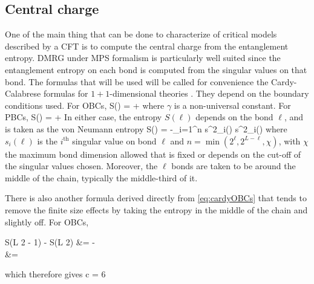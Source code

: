 	\subsection{Central charge}

		One of the main thing that can be done to characterize of critical models described by a CFT is to compute the central charge from the entanglement entropy. DMRG under MPS formalism is particularly well suited since the entanglement entropy on each bond is computed from the singular values on that bond. The formulas that will be used will be called for convenience the Cardy-Calabrese formulas for $1+1$-dimensional theories \cite{calabrese2004}. They depend on the boundary conditions used. For OBCs,
		\be S(\ell) =  \ln{} + \gamma \label{eq:cardyOBCs} \ee
		where $\gamma$ is a non-universal constant. For PBCs, 
		\be S(\ell) =  \ln{} + \gamma \label{eq:cardyPBCs} \ee
		In either case, the entropy $S(\ell)$ depends on the bond $\ell$, and is taken as the von Neumann entropy
		\be S(\ell) = -\sum_{i=1}^{n} s^2_i(\ell) \ln s^2_i(\ell) \ee
		where $s_i(\ell)$ is the $i^\text{th}$ singular value on bond $\ell$ and $n= \min(2^\ell, 2^{L-\ell}, \chi)$, with $\chi$ the maximum bond dimension allowed that is fixed or depends on the cut-off of the singular values chosen. Moreover, the $\ell$ bonds are taken to be around the middle of the chain, typically the middle-third of it.

		There is also another formula derived directly from \eqref{eq:cardyOBCs} that tends to remove the finite size effects \cite{nishimoto2011} by taking the entropy in the middle of the chain and slightly off. For OBCs,
		\be \begin{split} S\left(\frac L 2 - 1\right) - S\left(\frac L 2\right) &=  \ln{} -  \ln {} \\ &=  \ln \cos {} \end{split} \ee
		which therefore gives
		\be c = 6  \label{eq:otherOBCs} \ee